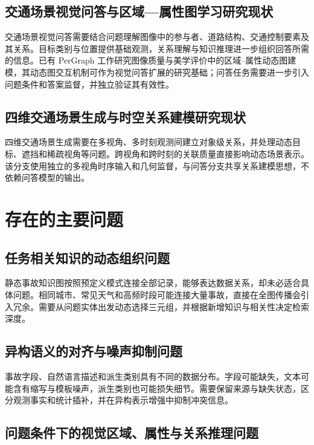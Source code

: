 \subsection{交通场景视觉问答与区域—属性图学习研究现状}

交通场景视觉问答需要结合问题理解图像中的参与者、道路结构、交通控制要素及其关系。目标类别与位置提供基础观测，关系理解与知识推理进一步组织回答所需的信息。已有 PerGraph 工作研究图像质量与美学评价中的区域--属性动态图建模，其动态图交互机制可作为视觉问答扩展的研究基础；问答任务需要进一步引入问题条件和答案监督，并独立验证其有效性。

\subsection{四维交通场景生成与时空关系建模研究现状}

四维交通场景生成需要在多视角、多时刻观测间建立对象级关系，并处理动态目标、遮挡和稀疏视角等问题。跨视角和跨时刻的关联质量直接影响动态场景表示。该分支使用独立的多视角时序输入和几何监督，与问答分支共享关系建模思想，不依赖问答模型的输出。

\section{存在的主要问题}

\subsection{任务相关知识的动态组织问题}

静态事故知识图按照预定义模式连接全部记录，能够表达数据关系，却未必适合具体问题。相同城市、常见天气和高频时段可能连接大量事故，直接在全图传播会引入冗余。需要从问题实体出发动态选择三元组，并根据新增知识与相关性决定检索深度。

\subsection{异构语义的对齐与噪声抑制问题}

事故字段、自然语言描述和派生类别具有不同的数据分布。字段可能缺失，文本可能含有缩写与模板噪声，派生类别也可能损失细节。需要保留来源与缺失状态，区分观测事实和统计插补，并在异构表示增强中抑制冲突信息。

\subsection{问题条件下的视觉区域、属性与关系推理问题}

